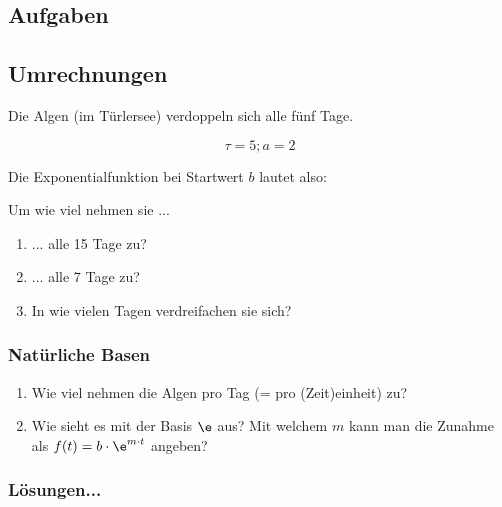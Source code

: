 \subsection*{Aufgaben}


\newpage



\subsection{Umrechnungen}
Die Algen (im Türlersee) verdoppeln sich alle fünf Tage.

$$\tau = 5; a= 2$$

Die Exponentialfunktion bei Startwert $b$ lautet also:



Um wie viel nehmen sie ...

\begin{enumerate}
\item ... alle 15 Tage zu?
\item ... alle 7 Tage zu?
\item In wie vielen Tagen verdreifachen sie sich?
\end{enumerate}
\subsubsection{Natürliche Basen}

\begin{enumerate}[resume]
\item Wie viel nehmen die Algen pro Tag (= pro (Zeit)einheit) zu?
\item Wie sieht es mit der Basis $\e$ aus? Mit welchem $m$ kann man die
  Zunahme als $f(t) = b \cdot{} \e^{m\cdot{}t}$ angeben?
\end{enumerate}
\newpage


\subsubsection*{Lösungen...}

